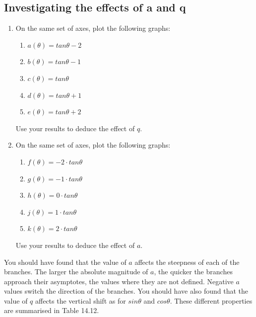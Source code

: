 \subsection*{Investigating the effects of a and q}
\nopagebreak
\begin{enumerate}[noitemsep, label=\textbf{\arabic*}. ] 
\item On the same set of axes, plot the following graphs:
\begin{enumerate}[noitemsep, label=\textbf{\alph*}. ] 
\item $a(\theta )=tan\theta -2$
\item $b(\theta )=tan\theta -1$
\item $c(\theta )=tan\theta $
\item $d(\theta )=tan\theta +1$
\item $e(\theta )=tan\theta +2$\end{enumerate}
Use your results to deduce the effect of $q$.
\item On the same set of axes, plot the following graphs:
\begin{enumerate}[noitemsep, label=\textbf{\alph*}. ] 
\item $f(\theta )=-2\ensuremath{\cdot}tan\theta $
\item $g(\theta )=-1\ensuremath{\cdot}tan\theta $
\item $h(\theta )=0\ensuremath{\cdot}tan\theta $
\item $j(\theta )=1\ensuremath{\cdot}tan\theta $
\item $k(\theta )=2\ensuremath{\cdot}tan\theta $\end{enumerate}
Use your results to deduce the effect of $a$.
\end{enumerate}
You should have found that the value of $a$ affects the steepness of each of the branches. The larger the absolute magnitude of $a$, the quicker the branches approach their asymptotes, the values where they are not defined. Negative $\mathit{a}$ values switch the direction of the branches.
You should have also found that the value of $q$ affects the vertical shift as for $sin\theta $ and $cos\theta $.
These different properties are summarised in Table 14.12.\par 
